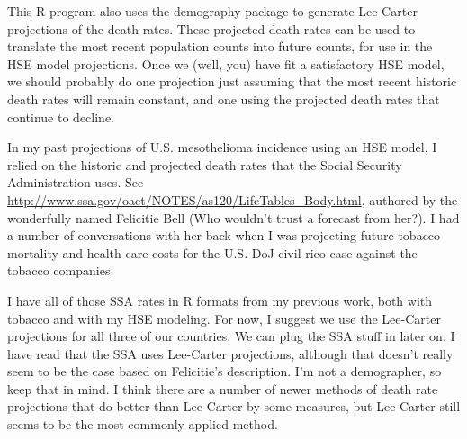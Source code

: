 \documentclass{article}\usepackage{graphicx, color}
\begin{document}
This R program also uses the demography package to generate Lee-Carter projections of the death rates.  These projected death rates can be used to translate the most recent population counts into future counts, for use in the HSE model projections.  Once we (well, you) have fit a satisfactory HSE model, we should probably do one projection just assuming that the most recent historic death rates will remain constant, and one using the projected death rates that continue to decline.

In my past projections of U.S. mesothelioma incidence using an HSE model, I relied on the historic and projected death rates that the Social Security Administration uses.  See \url{http://www.ssa.gov/oact/NOTES/as120/LifeTables_Body.html}, authored by the wonderfully named Felicitie Bell (Who wouldn't trust a forecast from her?).  I had a number of conversations with her back when I was projecting future tobacco mortality and health care costs for the U.S. DoJ civil rico case against the tobacco companies.

I have all of those SSA rates in R formats from my previous work, both with tobacco and with my HSE modeling.  For now, I suggest we use the Lee-Carter projections for all three of our countries.  We can plug the SSA stuff in later on.  I have read that the SSA uses Lee-Carter projections, although that doesn't really seem to be the case based on Felicitie's description.  I'm not a demographer, so keep that in mind.  I think there are a number of newer methods of death rate projections that do better than Lee Carter by some measures, but Lee-Carter still seems to be the most commonly applied method.
\end{document}

